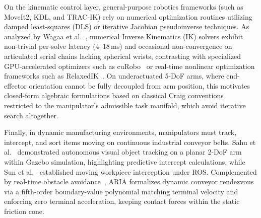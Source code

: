 \documentclass[journal]{IEEEtran}
\begin{document}
On the kinematic control layer, general-purpose robotics frameworks (such as MoveIt2, KDL, and TRAC-IK) rely on numerical optimization routines utilizing damped least-squares (DLS) or iterative Jacobian pseudoinverse techniques. As analyzed by Wagaa et al.~\cite{aria_040_wagaa_2023_analytical}, numerical Inverse Kinematics (IK) solvers exhibit non-trivial per-solve latency ($4\text{--}18$\,ms) and occasional non-convergence on articulated serial chains lacking spherical wrists, contrasting with specialized GPU-accelerated optimizers such as cuRobo~\cite{aria_050_sundaralingam_2024_curobo} or real-time nonlinear optimization frameworks such as RelaxedIK~\cite{aria_076_li_2021_hybrik}. On underactuated 5-DoF arms, where end-effector orientation cannot be fully decoupled from arm position, this motivates closed-form algebraic formulations based on classical Craig conventions~\cite{craig2005introduction} restricted to the manipulator's admissible task manifold, which avoid iterative search altogether.

Finally, in dynamic manufacturing environments, manipulators must track, intercept, and sort items moving on continuous industrial conveyor belts. Sahu et al.~\cite{aria_010_sahu_2025_autonomous} demonstrated autonomous visual object tracking on a planar 2-DoF arm within Gazebo simulation, highlighting predictive intercept calculations, while Sun et al.~\cite{aria_base_sun2022moving} established moving workpiece interception under ROS. Complemented by real-time obstacle avoidance~\cite{aria_035_fishman_2025_avoid}, ARIA formalizes dynamic conveyor rendezvous via a fifth-order boundary-value polynomial matching terminal velocity and enforcing zero terminal acceleration, keeping contact forces within the static friction cone.
\end{document}
